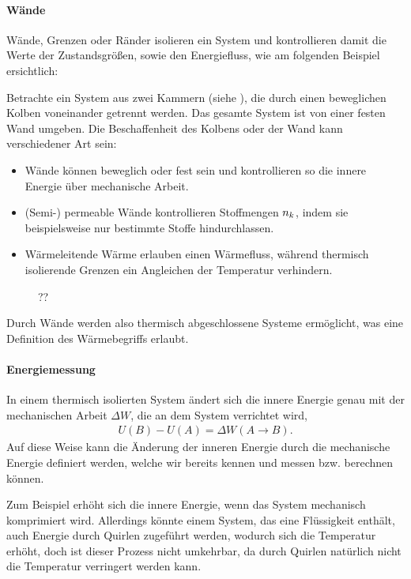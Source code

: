 \paragraph*{Wände}

Wände, Grenzen oder Ränder isolieren ein System und kontrollieren damit die Werte der Zustandsgrößen, sowie den Energiefluss, wie am folgenden Beispiel ersichtlich:

Betrachte ein System aus zwei Kammern (siehe ), die durch einen beweglichen Kolben voneinander getrennt werden. Das gesamte System ist von einer festen Wand umgeben. Die Beschaffenheit des Kolbens oder der Wand kann verschiedener Art sein:
\begin{itemize}
    \item Wände können beweglich oder fest sein und kontrollieren so die innere Energie über mechanische Arbeit.
    \item (Semi-) permeable Wände kontrollieren Stoffmengen $n_k$, indem sie beispielsweise nur bestimmte Stoffe hindurchlassen.
    \item Wärmeleitende Wärme erlauben einen Wärmefluss, während thermisch isolierende Grenzen ein Angleichen der Temperatur verhindern.
\end{itemize}

\begin{figure}[htb]
    \centering
    ??
    \caption{}
    \label{fig:zwei_kammern_mit_kolben}
\end{figure}

Durch Wände werden also thermisch abgeschlossene Systeme ermöglicht, was eine Definition des Wärmebegriffs erlaubt.


\paragraph*{Energiemessung}

In einem thermisch isolierten System ändert sich die innere Energie genau mit der mechanischen Arbeit $\Delta W$, die an dem System verrichtet wird,
\begin{align*}
    U(B)-U(A) =\Delta W(A\rightarrow B).
\end{align*}
Auf diese Weise kann die Änderung der inneren Energie durch die mechanische Energie definiert werden, welche wir bereits kennen und messen bzw. berechnen können.

Zum Beispiel erhöht sich die innere Energie, wenn das System mechanisch komprimiert wird.
Allerdings könnte einem System, das eine Flüssigkeit enthält, auch Energie durch Quirlen zugeführt werden, wodurch sich die Temperatur erhöht, doch ist dieser Prozess nicht umkehrbar, da durch Quirlen natürlich nicht die Temperatur verringert werden kann.

